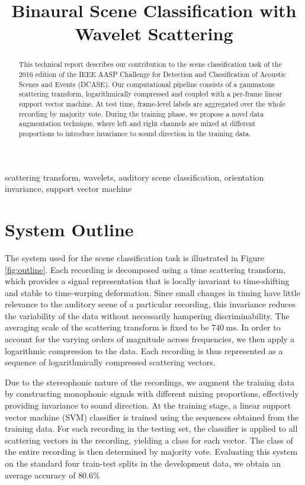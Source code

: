 \documentclass{article}
\title{Binaural Scene Classification with Wavelet Scattering}
\begin{document}
\ninept
\maketitle

\begin{sloppy}

\begin{abstract}
This technical report describes our contribution to the scene classification task of the 2016 edition of the IEEE AASP Challenge for Detection and Classification of Acoustic Scenes and Events (DCASE). Our computational pipeline consists of a gammatone scattering transform, logarithmically compressed and coupled with a per-frame linear support vector machine. At test time, frame-level labels are aggregated over the whole recording by majority vote. During the training phase, we propose a novel data augmentation technique, where left and right channels are mixed at different proportions to introduce invariance to sound direction in the training data.
\end{abstract}

\begin{keywords}
scattering transform, wavelets, auditory scene classification, orientation invariance, support vector machine
\end{keywords}

\section{System Outline}
\label{sec:outline}
The system used for the scene classification task is illustrated in Figure \ref{fig:outline}. Each recording is decomposed using a time scattering transform, which provides a signal representation that is locally invariant to time-shifting and stable to time-warping deformation. Since small changes in timing have little relevance to the auditory scene of a particular recording, this invariance reduces the variability of the data without necessarily hampering discriminability. The averaging scale of the scattering transform is fixed to be $740~\mathrm{ms}$. In order to account for the varying orders of magnitude across frequencies, we then apply a logarithmic compression to the data. Each recording is thus represented as a sequence of logarithmically compressed scattering vectors.

Due to the stereophonic nature of the recordings, we augment the training data by constructing monophonic signals with different mixing proportions, effectively providing invariance to sound direction. At the training stage, a linear support vector machine (SVM) classifier is trained using the sequences obtained from the training data. For each recording in the testing set, the classifier is applied to all scattering vectors in the recording, yielding a class for each vector. The class of the entire recording is then determined by majority vote. Evaluating this system on the standard four train-test splits in the development data, we obtain an average accuracy of $80.6\%$


\end{sloppy}
\end{document}
